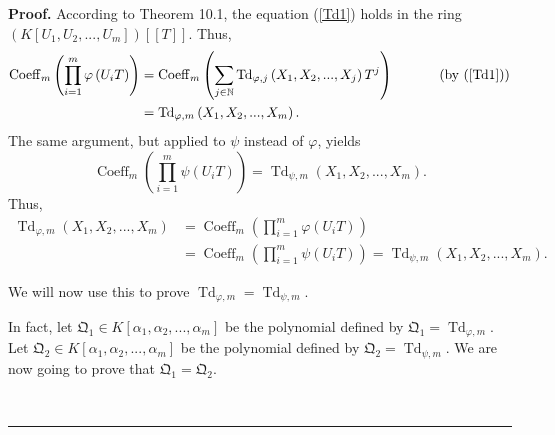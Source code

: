 \documentclass[numbers=enddot,12pt,final,onecolumn,notitlepage]{scrartcl}%
\newenvironment{proof}[1][Proof]{\noindent\textbf{#1.} }{\ \rule{0.5em}{0.5em}}
\begin{document}
\begin{proof}
According to Theorem 10.1, the equation (\ref{Td1}) holds in the ring $\left(
K\left[  U_{1},U_{2},...,U_{m}\right]  \right)  \left[  \left[  T\right]
\right]  $. Thus,%
\begin{align*}
\operatorname*{Coeff}\nolimits_{m}\left(  \prod\limits_{i=1}^{m}\varphi\left(
U_{i}T\right)  \right)   &  =\operatorname*{Coeff}\nolimits_{m}\left(
\sum_{j\in\mathbb{N}}\operatorname*{Td}\nolimits_{\varphi,j}\left(
X_{1},X_{2},...,X_{j}\right)  T^{j}\right)  \ \ \ \ \ \ \ \ \ \ \left(
\text{by (\ref{Td1})}\right) \\
&  =\operatorname*{Td}\nolimits_{\varphi,m}\left(  X_{1},X_{2},...,X_{m}%
\right)  .
\end{align*}
The same argument, but applied to $\psi$ instead of $\varphi$, yields%
\[
\operatorname*{Coeff}\nolimits_{m}\left(  \prod\limits_{i=1}^{m}\psi\left(
U_{i}T\right)  \right)  =\operatorname*{Td}\nolimits_{\psi,m}\left(
X_{1},X_{2},...,X_{m}\right)  .
\]
Thus,%
\begin{align*}
\operatorname*{Td}\nolimits_{\varphi,m}\left(  X_{1},X_{2},...,X_{m}\right)
&  =\operatorname*{Coeff}\nolimits_{m}\left(  \prod\limits_{i=1}^{m}%
\varphi\left(  U_{i}T\right)  \right) \\
&  =\operatorname*{Coeff}\nolimits_{m}\left(  \prod\limits_{i=1}^{m}%
\psi\left(  U_{i}T\right)  \right)  =\operatorname*{Td}\nolimits_{\psi
,m}\left(  X_{1},X_{2},...,X_{m}\right)  .
\end{align*}


We will now use this to prove $\operatorname*{Td}\nolimits_{\varphi
,m}=\operatorname*{Td}\nolimits_{\psi,m}$.

In fact, let $\mathfrak{Q}_{1}\in K\left[  \alpha_{1},\alpha_{2}%
,...,\alpha_{m}\right]  $ be the polynomial defined by $\mathfrak{Q}%
_{1}=\operatorname*{Td}\nolimits_{\varphi,m}$. Let $\mathfrak{Q}_{2}\in
K\left[  \alpha_{1},\alpha_{2},...,\alpha_{m}\right]  $ be the polynomial
defined by $\mathfrak{Q}_{2}=\operatorname*{Td}\nolimits_{\psi,m}$. We are now
going to prove that $\mathfrak{Q}_{1}=\mathfrak{Q}_{2}$.


\end{proof}
\end{document}
